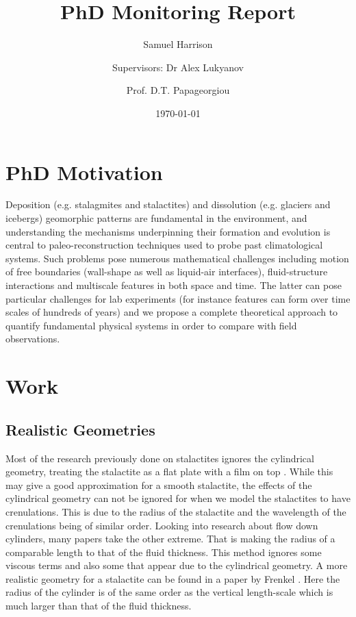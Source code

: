 \documentclass[12pt]{article}
\title{PhD Monitoring Report}
\author[1,2]{Samuel  Harrison}
\author[1]{\authorcr Supervisors: Dr Alex Lukyanov }
\author[2]{\authorcr Prof. D.T. Papageorgiou}
\affil[1]{ University of Reading}
\affil[2]{Imperial College London}
\date{\today}
\begin{document}
	\maketitle
	\section{PhD Motivation}
Deposition (e.g. stalagmites and stalactites) and dissolution (e.g. glaciers and icebergs) geomorphic patterns are fundamental in the environment,
and understanding the mechanisms underpinning their formation and evolution is central to paleo-reconstruction techniques used to
probe past climatological systems. Such problems pose numerous mathematical challenges including motion of free boundaries (wall-shape as well
as liquid-air interfaces), fluid-structure interactions and multiscale features in both space and time. The latter can pose particular challenges for
lab experiments (for instance features can form over time scales of hundreds of years) and we propose a complete theoretical approach
to quantify fundamental physical systems in order to compare with field observations.

\section{Work}
\subsection{Realistic Geometries}
Most of the research previously done on stalactites ignores the cylindrical geometry, treating the stalactite as a flat plate with a film on top \cite{short,camporeale_2017,doi:10.1098/rspa.2015.0031}. While this may give a good approximation for a smooth stalactite, the effects of the cylindrical geometry can not be ignored for when we model the stalactites to have crenulations. This is due to the radius of the stalactite and the wavelength of the crenulations being of similar order. Looking into research about flow down cylinders, many papers take the other extreme. That is making the radius of a comparable length to that of the fluid thickness\cite{ CRASTER_2006}. This method ignores some viscous terms and also some that appear due to the cylindrical geometry. A more realistic geometry for a stalactite can be found in a paper by Frenkel \cite{Frenkel_1992}. Here the radius of the cylinder is of the same order as the vertical length-scale which is much larger than that of the fluid thickness.
\end{document}
